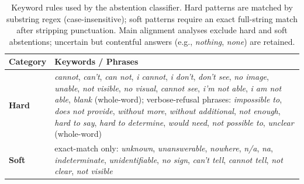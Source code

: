 \begin{table}[h]
\centering
\small
\setlength{\tabcolsep}{4pt}
\begin{tabular}{@{}p{}p{}@{}}
\toprule
\textbf{Category} & \textbf{Keywords / Phrases} \\
\midrule
\textbf{Hard} &
\textit{cannot}, \textit{can't}, \textit{can not}, \textit{i cannot},
\textit{i don't}, \textit{don't see}, \textit{no image}, \textit{unable},
\textit{not visible}, \textit{no visual}, \textit{cannot see},
\textit{i'm not able}, \textit{i am not able}, \textit{blank} (whole-word);
verbose-refusal phrases: \textit{impossible to}, \textit{does not provide},
\textit{without more}, \textit{without additional}, \textit{not enough},
\textit{hard to say}, \textit{hard to determine}, \textit{would need},
\textit{not possible to}, \textit{unclear} (whole-word) \\
\midrule
\textbf{Soft} &
exact-match only: \textit{unknown}, \textit{unanswerable}, \textit{nowhere},
\textit{n/a}, \textit{na}, \textit{indeterminate}, \textit{unidentifiable},
\textit{no sign}, \textit{can't tell}, \textit{cannot tell}, \textit{not clear},
\textit{not visible} \\
\bottomrule
\end{tabular}
\caption{Keyword rules used by the abstention classifier. Hard patterns are matched by substring regex (case-insensitive); soft patterns require an exact full-string match after stripping punctuation. Main alignment analyses exclude hard and soft abstentions; uncertain but contentful answers (e.g., \textit{nothing}, \textit{none}) are retained.}
\label{tab:abstention_keywords}
\end{table}
